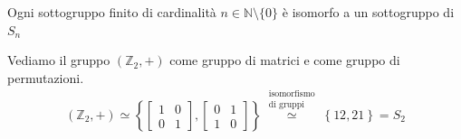 \documentclass[../main.tex]{subfiles}
\begin{document}
\begin{theorem}
    Ogni sottogruppo finito di cardinalità $n \in \mathbb{N} \setminus \{0\}$ è isomorfo a un sottogruppo di $S_n$
\end{theorem}

\begin{example}
    Vediamo il gruppo $(\mathbb{Z}_2,+)$ come gruppo di matrici e come gruppo di permutazioni.
    \begin{equation*}
        (\mathbb{Z}_2, +) \simeq \left\{\begin{bmatrix}
            1 & 0 \\
            0 & 1
        \end{bmatrix}, \begin{bmatrix}
            0 & 1 \\
            1 & 0
        \end{bmatrix}\right\} \overset{\substack{\text{isomorfismo}\\\text{di gruppi}}}{\simeq} \left\{12,21\right\} = S_2
    \end{equation*}
\end{example}
\end{document}

